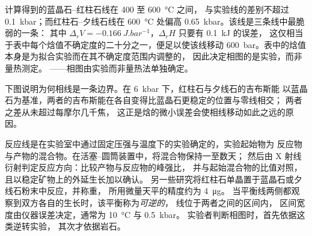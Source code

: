 计算得到的蓝晶石–红柱石线在 400 至 \qty{600}{\celsius} 之间，
与实验线的差别不超过 \qty{0.1}{kbar}；而红柱石–夕线石线在
\qty{600}{\celsius} 处偏高 \qty{0.65}{kbar}。该线是三条线中最脆弱的一条：
其中 $\Delta_r V = \qty{-0.166}{J.bar^{-1}}$，$\Delta_r H$ 只要有 \qty{0.1}{kJ} 的误差，
这仅相当于表中每个焓值不确定度的二十分之一，便足以使该线移动
\qty{600}{bar}。表中的焓值本身是为拟合实验而在其不确定度范围内调整的，
因此决定相图的是实验，而非量热测定。
——相图由实验而非量热法单独确定。

下图说明为何相线是一条边界。在 \qty{6}{kbar} 下，红柱石与夕线石的吉布斯能
以蓝晶石为基准，两者的吉布斯能在各自变得比蓝晶石更稳定的位置与零线相交；
两者之差从未超过每摩尔几千焦，
这正是焓的微小误差会使相线移动如此之远的原因。

\begin{omfigure}
\centering
{}
\par{}
\end{omfigure}

\begin{inthelab}[反应的逆转]
反应线是在实验室中通过固定压强与温度下的实验确定的，实验起始物为
反应物与产物的混合物。在活塞–圆筒装置中，将混合物保持一至数天；
然后由 X 射线衍射判定反应方向：比较产物与反应物的峰强比，
并与起始混合物的比值对照，且以稳定矿物上的外延生长加以确认。
另一些研究将红柱石单晶置于蓝晶石或夕线石粉末中反应，并称重，
所用微量天平的精度约为 \qty{4}{\micro g}。
当平衡线两侧都观察到双方各自的生长时，该平衡称为\emph{可逆的}，
线位于两者之间的区间内，
区间宽度由仪器误差决定，通常为 \qty{10}{\celsius} 与 \qty{0.5}{kbar}。
实验者判断相图时，首先依据这类逆转实验，
其次才依据岩石。
\end{inthelab}

